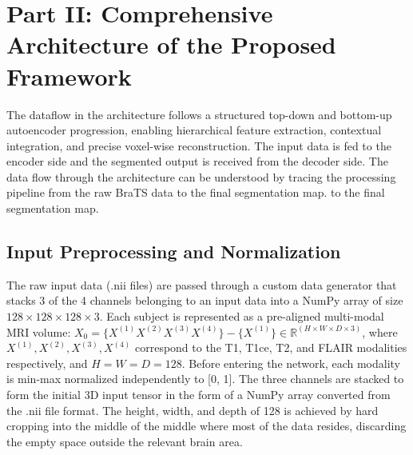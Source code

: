 
\section*{Part II: Comprehensive Architecture of the Proposed Framework}

The dataflow in the architecture follows a structured top-down and bottom-up autoencoder progression, enabling hierarchical feature extraction, contextual integration, and precise voxel-wise reconstruction. The input data is fed to the encoder side and the segmented output is received from the decoder side.
The data flow through the architecture can be understood by tracing the processing pipeline from the raw BraTS data to the final segmentation map. to the final segmentation map.

\subsection{Input Preprocessing and Normalization}

The raw input data (.nii files) are passed through a custom data generator that stacks 3 of the 4 channels belonging to an input data into a NumPy array of size $128 \times 128 \times 128 \times 3$.
Each subject is represented as a pre-aligned multi-modal MRI volume:
$X_0 = \{X^{(1)} X^{(2)} X^{(3)} X^{(4)}\} - \{X^{(1)}\}\in \mathbb{R}^{(H\times W\times D\times 3)}$, where $X^{(1)}, X^{(2)}, X^{(3)}, X^{(4)}$ correspond to the T1, T1ce, T2, and FLAIR modalities respectively, and $H = W = D = 128$. Before entering the network, each modality is min-max normalized independently to [0, 1]. The three channels are stacked to form the initial 3D input tensor in the form of a NumPy array converted from the .nii file format. The height, width, and depth of 128 is achieved by hard cropping into the middle of the middle where most of the data resides, discarding the empty space outside the relevant brain area.


